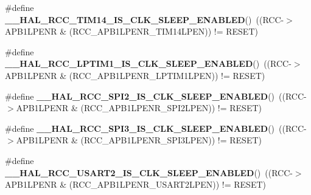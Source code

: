 \begin{DoxyCompactItemize}
\item 
\mbox{\label{group___r_c_c___clock___sleep___enable___disable___status_gaa280dfb85ebcc1d58d93cb9ced93a86f}} 
\#define {\bfseries \+\_\+\+\_\+\+H\+A\+L\+\_\+\+R\+C\+C\+\_\+\+T\+I\+M14\+\_\+\+I\+S\+\_\+\+C\+L\+K\+\_\+\+S\+L\+E\+E\+P\+\_\+\+E\+N\+A\+B\+L\+ED}()~((R\+CC-\/$>$A\+P\+B1\+L\+P\+E\+NR \& (R\+C\+C\+\_\+\+A\+P\+B1\+L\+P\+E\+N\+R\+\_\+\+T\+I\+M14\+L\+P\+EN)) != R\+E\+S\+ET)
\item 
\mbox{\label{group___r_c_c___clock___sleep___enable___disable___status_gaffbc4ed076ab667f6d48b734a8d2220e}} 
\#define {\bfseries \+\_\+\+\_\+\+H\+A\+L\+\_\+\+R\+C\+C\+\_\+\+L\+P\+T\+I\+M1\+\_\+\+I\+S\+\_\+\+C\+L\+K\+\_\+\+S\+L\+E\+E\+P\+\_\+\+E\+N\+A\+B\+L\+ED}()~((R\+CC-\/$>$A\+P\+B1\+L\+P\+E\+NR \& (R\+C\+C\+\_\+\+A\+P\+B1\+L\+P\+E\+N\+R\+\_\+\+L\+P\+T\+I\+M1\+L\+P\+EN)) != R\+E\+S\+ET)
\item 
\mbox{\label{group___r_c_c___clock___sleep___enable___disable___status_gad6ee3d390b2b2748575725f5b0c42cfc}} 
\#define {\bfseries \+\_\+\+\_\+\+H\+A\+L\+\_\+\+R\+C\+C\+\_\+\+S\+P\+I2\+\_\+\+I\+S\+\_\+\+C\+L\+K\+\_\+\+S\+L\+E\+E\+P\+\_\+\+E\+N\+A\+B\+L\+ED}()~((R\+CC-\/$>$A\+P\+B1\+L\+P\+E\+NR \& (R\+C\+C\+\_\+\+A\+P\+B1\+L\+P\+E\+N\+R\+\_\+\+S\+P\+I2\+L\+P\+EN)) != R\+E\+S\+ET)
\item 
\mbox{\label{group___r_c_c___clock___sleep___enable___disable___status_ga817817bac995cdace960abeeea6a26b6}} 
\#define {\bfseries \+\_\+\+\_\+\+H\+A\+L\+\_\+\+R\+C\+C\+\_\+\+S\+P\+I3\+\_\+\+I\+S\+\_\+\+C\+L\+K\+\_\+\+S\+L\+E\+E\+P\+\_\+\+E\+N\+A\+B\+L\+ED}()~((R\+CC-\/$>$A\+P\+B1\+L\+P\+E\+NR \& (R\+C\+C\+\_\+\+A\+P\+B1\+L\+P\+E\+N\+R\+\_\+\+S\+P\+I3\+L\+P\+EN)) != R\+E\+S\+ET)
\item 
\mbox{\label{group___r_c_c___clock___sleep___enable___disable___status_ga91dc6d0fdf5c1c70158336df3bf5e097}} 
\#define {\bfseries \+\_\+\+\_\+\+H\+A\+L\+\_\+\+R\+C\+C\+\_\+\+U\+S\+A\+R\+T2\+\_\+\+I\+S\+\_\+\+C\+L\+K\+\_\+\+S\+L\+E\+E\+P\+\_\+\+E\+N\+A\+B\+L\+ED}()~((R\+CC-\/$>$A\+P\+B1\+L\+P\+E\+NR \& (R\+C\+C\+\_\+\+A\+P\+B1\+L\+P\+E\+N\+R\+\_\+\+U\+S\+A\+R\+T2\+L\+P\+EN)) != R\+E\+S\+ET)

\end{DoxyCompactItemize}
